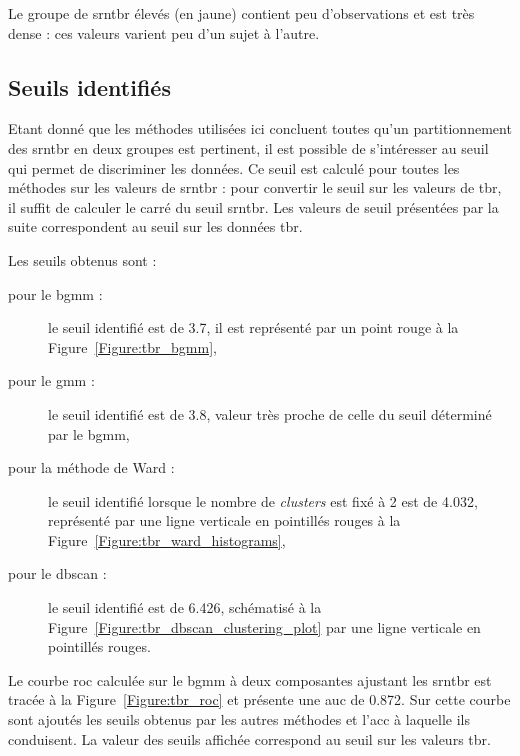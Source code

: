Le groupe de \gls{srntbr} élevés (en jaune) contient peu d'observations et est très dense : ces valeurs varient peu d'un sujet à l'autre.


\subsection{Seuils identifiés}
Etant donné que les méthodes utilisées ici concluent toutes qu'un partitionnement des \gls{srntbr} en deux groupes est pertinent, il est possible de s'intéresser
au seuil qui permet de discriminer les données. Ce seuil est calculé pour toutes les méthodes sur les valeurs de \gls{srntbr} : pour convertir le seuil sur 
les valeurs de \gls {tbr}, il suffit de calculer le carré du seuil \gls{srntbr}. Les valeurs de seuil présentées par la suite correspondent au seuil
sur les données \gls{tbr}.

Les seuils obtenus sont : 
\begin{description}
\item[pour le \gls{bgmm} : ] le seuil identifié est de 3.7, il est représenté par un point rouge à la Figure~\ref{Figure:tbr_bgmm},
\item[pour le \gls{gmm} : ] le seuil identifié est de 3.8, valeur très proche de celle du seuil déterminé par le \gls{bgmm},
\item[pour la méthode de Ward : ] le seuil identifié lorsque le nombre de \textit{clusters} est fixé à 2 est de 4.032, représenté
par une ligne verticale en pointillés rouges à la Figure~\ref{Figure:tbr_ward_histograms},
\item[pour le \gls{dbscan} : ] le seuil identifié est de 6.426, schématisé à la Figure~\ref{Figure:tbr_dbscan_clustering_plot} par une ligne
verticale en pointillés rouges. 
\end{description}

Le courbe \gls{roc} calculée sur le \gls{bgmm} à deux composantes ajustant les \gls{srntbr} est tracée à la Figure~\ref{Figure:tbr_roc} et 
présente une \gls{auc} de 0.872. Sur cette courbe sont ajoutés les seuils obtenus par les autres méthodes et l'\gls{acc} à laquelle ils conduisent. 
La valeur des seuils affichée correspond au seuil sur les valeurs \gls{tbr}. 

